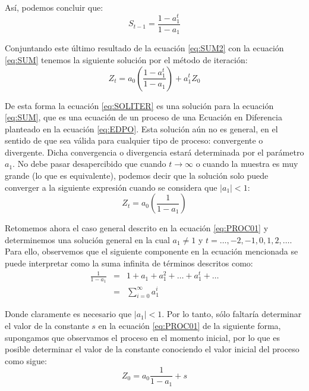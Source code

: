 \documentclass[
]{book}
\begin{document}
Así, podemos concluir que:
\begin{equation}
    S_{t-1} = \frac{1 - a^{t}_1}{1 - a_1}
    \label{eq:SUM2}
\end{equation}

Conjuntando este último resultado de la ecuación \eqref{eq:SUM2} con la ecuación \eqref{eq:SUM} tenemos la siguiente solución por el método de iteración:
\begin{equation}
    Z_t = a_0 \left( \frac{1 - a^{t}_1}{1 - a_1} \right) + a^t_1 Z_0
    \label{eq:SOLITER}
\end{equation}

De esta forma la ecuación \eqref{eq:SOLITER} es una solución para la ecuación \eqref{eq:SUM}, que es una ecuación de un proceso de una Ecuación en Diferencia planteado en la ecuación \eqref{eq:EDPO}. Esta solución aún no es general, en el sentido de que sea válida para cualquier tipo de proceso: convergente o divergente. Dicha convergencia o divergencia estará determinada por el parámetro \(a_1\). No debe pasar desapercibido que cuando \(t \rightarrow \infty\) o cuando la muestra es muy grande (lo que es equivalente), podemos decir que la solución solo puede converger a la siguiente expresión cuando se considera que \(|a_1| < 1\):
\begin{equation}
    Z_t = a_0 \left( \frac{1}{1 - a_1} \right)
    \label{eq:trayec}
\end{equation}

Retomemos ahora el caso general descrito en la ecuación \eqref{eq:PROC01} y determinemos una solución general en la cual \(a_1 \neq 1\) y \(t = \ldots, -2, -1, 0, 1, 2, \ldots\). Para ello, observemos que el siguiente componente en la ecuación mencionada se puede interpretar como la suma infinita de términos descritos como:
\begin{eqnarray}
    \frac{1}{1 - a_1} & = & 1 + a_1 + a_1^2 + \ldots + a_1^t + \ldots \nonumber \\
    & = & \sum_{i = 0}^{\infty} a_1^{i}
    \label{eq:SUMINF}
\end{eqnarray}

Donde claramente es necesario que \(|a_1| < 1\). Por lo tanto, sólo faltaría determinar el valor de la constante \(s\) en la ecuación \eqref{eq:PROC01} de la siguiente forma, supongamos que observamos el proceso en el momento inicial, por lo que es posible determinar el valor de la constante conociendo el valor inicial del proceso como sigue:
\begin{equation}
    Z_0 = a_0 \frac{1}{1 - a_1} + s
\label{eq:Z0}
\end{equation}
\end{document}

